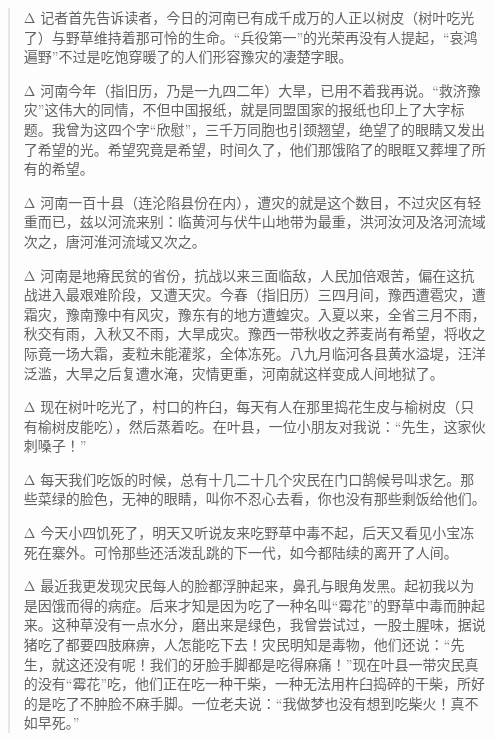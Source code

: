 \begin{quote}
	\begin{description}
		\item {\Add Δ} 记者首先告诉读者，今日的河南已有成千成万的人正以树皮（树叶吃光了）与野草维持着那可怜的生命。“兵役第一”的光荣再没有人提起，“哀鸿遍野”不过是吃饱穿暖了的人们形容豫灾的凄楚字眼。\\

		\item {\Add Δ} 河南今年（指旧历，乃是一九四二年）大旱，已用不着我再说。“救济豫灾”这伟大的同情，不但中国报纸，就是同盟国家的报纸也印上了大字标题。我曾为这四个字“欣慰”，三千万同胞也引颈翘望，绝望了的眼睛又发出了希望的光。希望究竟是希望，时间久了，他们那饿陷了的眼眶又葬埋了所有的希望。\\

		\item {\Add Δ} 河南一百十县（连沦陷县份在内），遭灾的就是这个数目，不过灾区有轻重而已，兹以河流来别：临黄河与伏牛山地带为最重，洪河汝河及洛河流域次之，唐河淮河流域又次之。\\

		\item {\Add Δ} 河南是地瘠民贫的省份，抗战以来三面临敌，人民加倍艰苦，偏在这抗战进入最艰难阶段，又遭天灾。今春（指旧历）三四月间，豫西遭雹灾，遭霜灾，豫南豫中有风灾，豫东有的地方遭蝗灾。入夏以来，全省三月不雨，秋交有雨，入秋又不雨，大旱成灾。豫西一带秋收之荞麦尚有希望，将收之际竟一场大霜，麦粒未能灌浆，全体冻死。八九月临河各县黄水溢堤，汪洋泛滥，大旱之后复遭水淹，灾情更重，河南就这样变成人间地狱了。\\

		\item {\Add Δ} 现在树叶吃光了，村口的杵臼，每天有人在那里捣花生皮与榆树皮（只有榆树皮能吃），然后蒸着吃。在叶县，一位小朋友对我说：“先生，这家伙刺嗓子！”\\

		\item {\Add Δ} 每天我们吃饭的时候，总有十几二十几个灾民在门口鹄候号叫求乞。那些菜绿的脸色，无神的眼睛，叫你不忍心去看，你也没有那些剩饭给他们。\\

		\item {\Add Δ} 今天小四饥死了，明天又听说友来吃野草中毒不起，后天又看见小宝冻死在寨外。可怜那些还活泼乱跳的下一代，如今都陆续的离开了人间。\\

		\item {\Add Δ} 最近我更发现灾民每人的脸都浮肿起来，鼻孔与眼角发黑。起初我以为是因饿而得的病症。后来才知是因为吃了一种名叫“霉花”的野草中毒而肿起来。这种草没有一点水分，磨出来是绿色，我曾尝试过，一股土腥味，据说猪吃了都要四肢麻痹，人怎能吃下去！灾民明知是毒物，他们还说：“先生，就这还没有呢！我们的牙脸手脚都是吃得麻痛！”现在叶县一带灾民真的没有“霉花”吃，他们正在吃一种干柴，一种无法用杵臼捣碎的干柴，所好的是吃了不肿脸不麻手脚。一位老夫说：“我做梦也没有想到吃柴火！真不如早死。”\\


\end{description}
\end{quote}
